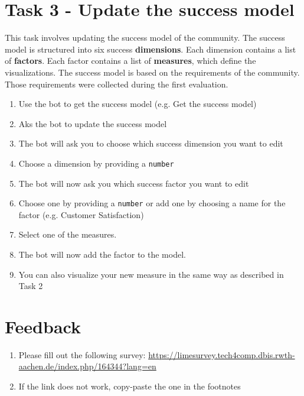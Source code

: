 \section*{Task 3 - Update the success model}
This task involves updating the success model of the community. The success model is structured into six success \textbf{dimensions}. Each dimension contains a list of \textbf{factors}. Each factor contains a list of \textbf{measures}, which define the visualizations.
The success model is based on the requirements of the community. Those requirements were collected during the first evaluation.
\begin{enumerate}
    \item Use the bot to get the success model (e.g. Get the success model)
    \item Aks the bot to update the success model
    \item The bot will ask you to choose which success dimension you want to edit
    \item Choose a dimension by providing a \texttt{number}
    \item The bot will now ask you which success factor you want to edit
    \item Choose one by providing a \texttt{number} or add one by choosing a name for the factor (e.g. Customer Satisfaction)
    \item Select one of the measures. 
    \item The bot will now add the factor to the model.
    \item You can also visualize your new measure in the same way as described in Task 2
\end{enumerate}

\section*{Feedback}
  
\begin{enumerate}
  \item Please fill out the following survey: \url{https://limesurvey.tech4comp.dbis.rwth-aachen.de/index.php/164344?lang=en}
  \item If the link does not work, copy-paste  the one in the footnotes \footnotemark 
\end{enumerate}

